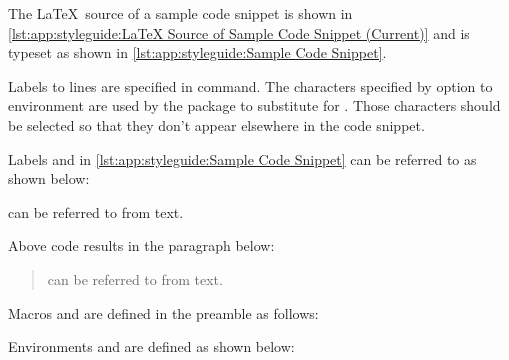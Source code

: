 

The \LaTeX\ source of a sample code snippet is shown in
\cref{lst:app:styleguide:LaTeX Source of Sample Code Snippet (Current)}
and is typeset as shown in
\cref{lst:app:styleguide:Sample Code Snippet}.

Labels to lines are specified in  command.
The characters specified by  option to 
environment are used by the  package to substitute
\qco{\\lnlbl\{\}} for .
Those characters should be selected so that they don't appear
elsewhere in the code snippet.

Labels  and  in
\cref{lst:app:styleguide:Sample Code Snippet}
can be referred to as shown below:

\begin{VerbatimU}
\begin{fcvref}[ln:base1]
 can be referred
to from text.
\end{fcvref}
\end{VerbatimU}

Above code results in the paragraph below:

\begin{quote}
\begin{fcvref}[ln:base1]
 can be referred
to from text.
\end{fcvref}
\end{quote}

Macros \qco{\\lnlbl\{\}} and \qco{\\lnref\{\}} are defined in
the preamble as follows:

\begin{VerbatimU}
\newcommand{\lnlblbase}{}
\newcommand{\lnlbl}[1]{%
  \phantomsection\label{\lnlblbase:#1}}
\newcommand{\lnrefbase}{}
\newcommand{\lnref}[1]{\ref{\lnrefbase:#1}}
\end{VerbatimU}

Environments  and  are defined as
shown below:

\begin{VerbatimU}
\newenvironment{fcvlabel}[1][]{%
  \renewcommand{\lnlblbase}{#1}%
  \ignorespaces}{\ignorespacesafterend}
\newenvironment{fcvref}[1][]{%
  \renewcommand{\lnrefbase}{#1}%
  \ignorespaces}{\ignorespacesafterend}
\end{VerbatimU}

